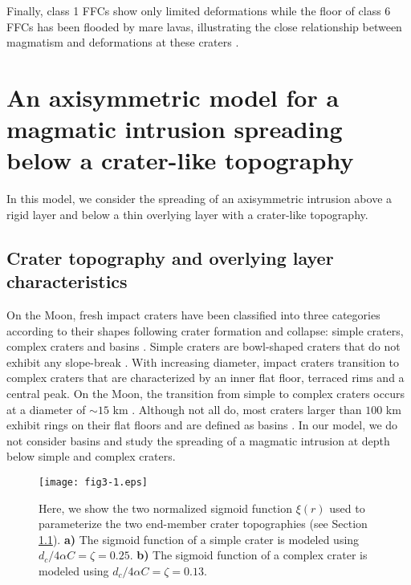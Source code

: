 	
Finally, class 1  FFCs show only limited deformations  while the floor
of class 6 FFCs has been flooded by mare lavas, illustrating the close
relationship  between  magmatism  and deformations  at  these  craters
\citep{Schultz:1976kt,Jozwiak:2012dq}.

\section[A model for crater-centered intrusion]{An axisymmetric model for a magmatic intrusion spreading
  below a crater-like topography}

In this model, we consider  the spreading of an axisymmetric intrusion
above  a  rigid  layer  and  below  a  thin  overlying  layer  with  a
crater-like topography.
	
\subsection{Crater topography and overlying layer characteristics}
\label{C5-Crater_Topography}
	
On  the Moon,  fresh impact  craters have  been classified  into three
categories according  to their  shapes following crater  formation and
collapse:    simple    craters,    complex    craters    and    basins
\citep{Pike:1974ux,Schultz:1976vl,Pike:1980eh,Baker:2011kh}.    Simple
craters are  bowl-shaped craters that  do not exhibit  any slope-break
\citep{Pike:1980eh}.    With  increasing   diameter,  impact   craters
transition to complex craters that  are characterized by an inner flat
floor, terraced rims  and a central peak. On the  Moon, the transition
from simple  to complex craters occurs  at a diameter of  $\sim 15$ km
\citep{Pike:1980eh,Hiesinger:2006cb,OKeefe:1999uj,Kalynn:2013fg}.
Although not all  do, most craters larger than $100$  km exhibit rings
on    their    flat    floors    and    are    defined    as    basins
\citep{Wilhelms:1987vb,Schultz:1988wb}.   In  our  model,  we  do  not
consider basins  and study  the spreading of  a magmatic  intrusion at
depth below simple and complex craters.

\begin{figure}[h!]
  \graphicspath{ {/Users/thorey/Documents/These/Submission/Article/FFC_JGR_2013/Paper_APRES_2nd_REVIEW/} }
  \centering
  \noindent\texttt{[image: fig3-1.eps]}
  \caption{ Here, we show the two normalized sigmoid function $\xi(r)$
    used to  parameterize the two end-member  crater topographies (see
    Section  \ref{C5-Crater_Topography}).    \textbf{a)}  The  sigmoid
    function    of    a    simple     crater    is    modeled    using
    $d_c/4\alpha C=\zeta=0.25$.  \textbf{b)} The sigmoid function of a
    complex crater is modeled using $d_c/4\alpha C=\zeta=0.13$. }
  \label{C5-fig3-1}
\end{figure}
	
